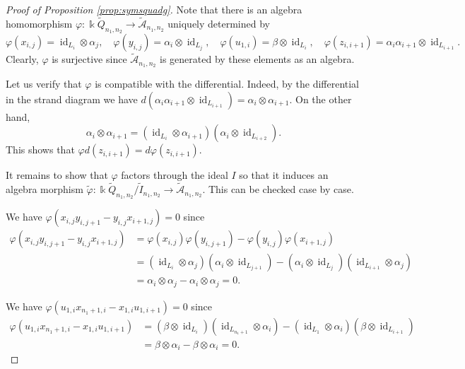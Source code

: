 \documentclass[a4paper, reqno, 11pt]{amsart}
\theoremstyle{definition}
\begin{document}
	\begin{proof}[Proof of Proposition \ref{prop:symsquadg}]
		Note that there is an algebra homomorphism $\varphi\colon \Bbbk \widetilde Q_{n_1, n_2} \to \widetilde{\mathcal{A}}_{n_1,n_2}$ uniquely determined by 
		\[
		\varphi(x_{i,j}) = \operatorname{id}_{L_i} \otimes \alpha_j,\quad
		\varphi(y_{i,j}) = \alpha_i \otimes \operatorname{id}_{L_j},\quad
		\varphi(u_{1,i}) = \beta \otimes \operatorname{id}_{L_i},\quad
		\varphi(z_{i,i+1}) = \alpha_i\alpha_{i+1} \otimes \operatorname{id}_{L_{i+1}}.
		\]
		Clearly, $\varphi$ is surjective since $\widetilde{\mathcal{A}}_{n_1,n_2}$ is generated by these elements as an algebra. 
		
		Let us verify that $\varphi$ is compatible with the differential. Indeed, by the differential in the strand diagram we have
		\(
		d(\alpha_i\alpha_{i+1} \otimes \operatorname{id}_{L_{i+1}}) = \alpha_i \otimes \alpha_{i+1}.
		\)
		On the other hand,
		\[
		\alpha_i \otimes \alpha_{i+1} = (\operatorname{id}_{L_i} \otimes \alpha_{i+1})(\alpha_i \otimes \operatorname{id}_{L_{i+2}}).
		\]
		This shows that $\varphi d(z_{i,i+1}) = d\varphi(z_{i,i+1})$.
		
		It remains to show that $\varphi$ factors through the ideal $I$ so that it induces an algebra morphism $\widetilde \varphi \colon \Bbbk \widetilde Q_{n_1, n_2}/\widetilde I_{n_1,n_2} \to \widetilde{\mathcal{A}}_{n_1,n_2}$. This can be checked case by case.
		
		We have $\varphi(x_{i,j} y_{i,j+1} - y_{i,j} x_{i+1,j}) = 0$ since
		\begin{align*}
			\varphi(x_{i,j} y_{i,j+1} - y_{i,j} x_{i+1,j})
			&= \varphi(x_{i,j})\varphi(y_{i,j+1}) - \varphi(y_{i,j})\varphi(x_{i+1,j})\\
			&= (\operatorname{id}_{L_i} \otimes \alpha_j)(\alpha_i \otimes \operatorname{id}_{L_{j+1}}) - (\alpha_i \otimes \operatorname{id}_{L_j})(\operatorname{id}_{L_{i+1}} \otimes \alpha_j)\\
			&= \alpha_i \otimes \alpha_j - \alpha_i \otimes \alpha_j = 0.
		\end{align*}
		
		We have $\varphi(u_{1,i} x_{n_1+1,i} - x_{1,i} u_{1,i+1}) = 0$ since
		\begin{align*}
			\varphi(u_{1,i} x_{n_1+1,i} - x_{1,i} u_{1,i+1})
			&= (\beta \otimes \operatorname{id}_{L_i})(\operatorname{id}_{L_{n_1+1}} \otimes \alpha_i) - (\operatorname{id}_{L_1} \otimes \alpha_i)(\beta \otimes \operatorname{id}_{L_{i+1}})\\
			&= \beta \otimes \alpha_i - \beta \otimes \alpha_i = 0.
		\end{align*}
		

\end{proof}
\end{document}
